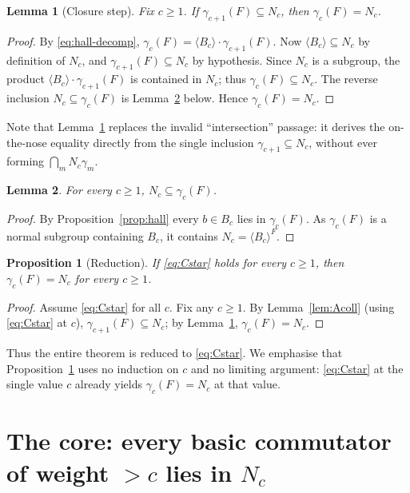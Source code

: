 \documentclass{amsart}
\newtheorem{lemma}{Lemma}
\newtheorem{proposition}{Proposition}
\theoremstyle{definition}
\theoremstyle{remark}
\begin{document}
\begin{lemma}[Closure step]\label{lem:closure}
Fix $c\ge1$. If $\gamma_{c+1}(F)\subseteq N_c$, then $\gamma_c(F)=N_c$.
\end{lemma}

\begin{proof}
By \eqref{eq:hall-decomp}, $\gamma_c(F)=\langle B_c\rangle\cdot\gamma_{c+1}(F)$.
Now $\langle B_c\rangle\subseteq N_c$ by definition of $N_c$, and
$\gamma_{c+1}(F)\subseteq N_c$ by hypothesis. Since $N_c$ is a subgroup, the
product $\langle B_c\rangle\cdot\gamma_{c+1}(F)$ is contained in $N_c$; thus
$\gamma_c(F)\subseteq N_c$. The reverse inclusion $N_c\subseteq\gamma_c(F)$ is
Lemma~\ref{lem:easy} below. Hence $\gamma_c(F)=N_c$.
\end{proof}

\noindent
Note that Lemma~\ref{lem:closure} replaces the invalid ``intersection'' passage:
it derives the on-the-nose equality directly from the single inclusion
$\gamma_{c+1}\subseteq N_c$, without ever forming $\bigcap_m N_c\gamma_m$.

\begin{lemma}\label{lem:easy}
For every $c\ge1$, $N_c\subseteq\gamma_c(F)$.
\end{lemma}

\begin{proof}
By Proposition~\ref{prop:hall} every $b\in B_c$ lies in $\gamma_c(F)$. As
$\gamma_c(F)$ is a normal subgroup containing $B_c$, it contains
$N_c=\langle B_c\rangle^{F}$.
\end{proof}

\begin{proposition}[Reduction]\label{prop:reduction}
If \eqref{eq:Cstar} holds for every $c\ge1$, then $\gamma_c(F)=N_c$ for every
$c\ge1$.
\end{proposition}

\begin{proof}
Assume \eqref{eq:Cstar} for all $c$. Fix any $c\ge1$. By
Lemma~\ref{lem:Acoll} (using \eqref{eq:Cstar} at $c$),
$\gamma_{c+1}(F)\subseteq N_c$; by Lemma~\ref{lem:closure},
$\gamma_c(F)=N_c$.
\end{proof}

\noindent
Thus the entire theorem is reduced to \eqref{eq:Cstar}. We emphasise that
Proposition~\ref{prop:reduction} uses no induction on $c$ and no limiting
argument: \eqref{eq:Cstar} at the single value $c$ already yields
$\gamma_c(F)=N_c$ at that value.

\section{The core: every basic commutator of weight $>c$ lies in $N_c$}
\label{sec:core}
\end{document}
